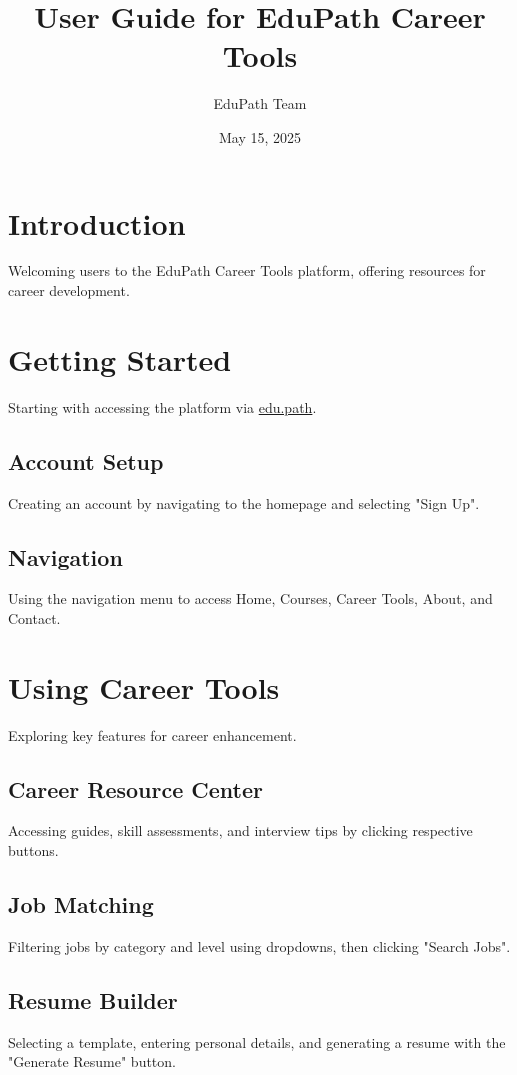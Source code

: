 \documentclass[a4paper,12pt]{article}
\title{User Guide for EduPath Career Tools}
\author{EduPath Team}
\date{May 15, 2025}
\begin{document}
\maketitle

\section*{Introduction}
Welcoming users to the EduPath Career Tools platform, offering resources for career development.

\section{Getting Started}
Starting with accessing the platform via \href{https://edu.path}{edu.path}.

\subsection{Account Setup}
Creating an account by navigating to the homepage and selecting "Sign Up".

\subsection{Navigation}
Using the navigation menu to access Home, Courses, Career Tools, About, and Contact.

\section{Using Career Tools}
Exploring key features for career enhancement.

\subsection{Career Resource Center}
Accessing guides, skill assessments, and interview tips by clicking respective buttons.

\subsection{Job Matching}
Filtering jobs by category and level using dropdowns, then clicking "Search Jobs".

\subsection{Resume Builder}
Selecting a template, entering personal details, and generating a resume with the "Generate Resume" button.
\end{document}
